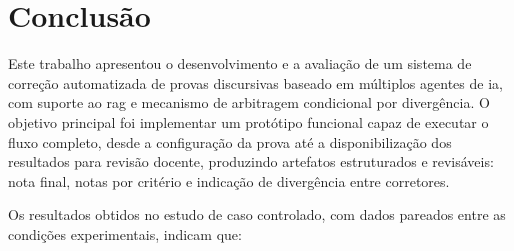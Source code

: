 \chapter{Conclusão}
\label{cap:conclusão}

Este trabalho apresentou o desenvolvimento e a avaliação de um sistema de correção automatizada de provas discursivas baseado em múltiplos agentes de \gls{ia}, com suporte ao \gls{rag} e mecanismo de arbitragem condicional por divergência. O objetivo principal foi implementar um protótipo funcional capaz de executar o fluxo completo, desde a configuração da prova até a disponibilização dos resultados para revisão docente, produzindo artefatos estruturados e revisáveis: nota final, notas por critério e indicação de divergência entre corretores.

Os resultados obtidos no estudo de caso controlado, com dados pareados entre as condições experimentais, indicam que:

